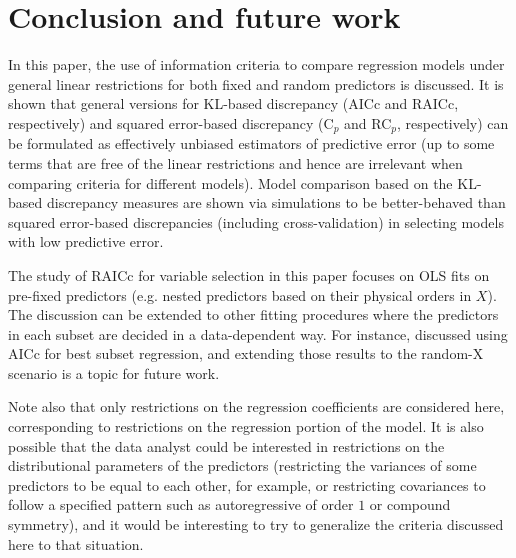\section{Conclusion and future work}
\label{sec:conclusion}
In this paper, the use of information criteria to compare regression models under general linear restrictions for both fixed and random predictors is discussed. It is shown that general versions for KL-based discrepancy (AICc and RAICc, respectively) and squared error-based discrepancy (C$_p$ and RC$_p$, respectively) can be formulated as effectively unbiased estimators of predictive error (up to some terms that are free of the linear restrictions and hence are irrelevant when comparing criteria for different models). Model comparison based on the KL-based discrepancy measures are shown via simulations to be better-behaved than squared error-based discrepancies (including cross-validation) in selecting models with low predictive error.

The study of RAICc for variable selection in this paper focuses on OLS fits on pre-fixed predictors (e.g. nested predictors based on their physical orders in $X$). The discussion can be extended to other fitting procedures where the predictors in each subset are decided in a data-dependent way. For instance, \citet{tian2019use} discussed using AICc for best subset regression, and extending those results to the random-X scenario is a topic for future work. 

Note also that only restrictions on the regression coefficients are considered here, corresponding to restrictions on the regression portion of the model. It is also possible that the data analyst could be interested in restrictions on the distributional parameters of the predictors (restricting the variances of some predictors to be equal to each other, for example, or restricting covariances to follow a specified pattern such as autoregressive of order $1$ or compound symmetry), and it would be interesting to try to generalize the criteria discussed here to that situation.